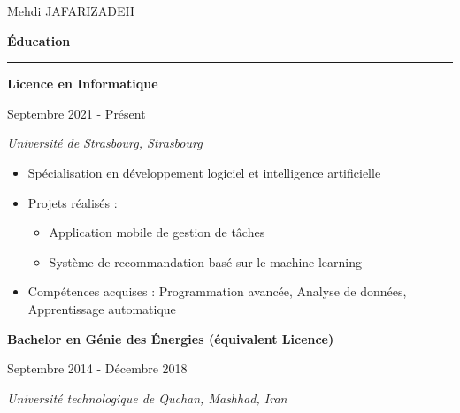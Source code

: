 \documentclass[a4paper]{letter}
\newcommand{\divider}{\rule{\linewidth}{0.9pt}}
\begin{document}
\begin{minipage}[t]{0.60\textwidth}


\setlength{\baselineskip}{1.5\baselineskip}
\vspace{0.7cm}

{\huge Mehdi JAFARIZADEH}

\vspace{1cm}


{\large \textbf{Éducation}}
\divider


{\textbf{Licence en Informatique}}

{\footnotesize Septembre 2021 - Présent}

{\textit{Université de Strasbourg, Strasbourg}}

\vspace{1mm}

\begin{itemize}
    \footnotesize
    
    \item Spécialisation en développement logiciel et intelligence artificielle
    \item Projets réalisés :
        \begin{itemize}
            \item Application mobile de gestion de tâches
            \item Système de recommandation basé sur le machine learning
        \end{itemize}
    \item Compétences acquises : Programmation avancée, Analyse de données, Apprentissage automatique
\end{itemize}

\vspace{3mm}


{\textbf{Bachelor en Génie des Énergies (équivalent Licence)}}

{\footnotesize Septembre 2014 - Décembre 2018}

{\textit{Université technologique de Quchan, Mashhad, Iran}}

\vspace{1mm}


\end{minipage}
\end{document}
